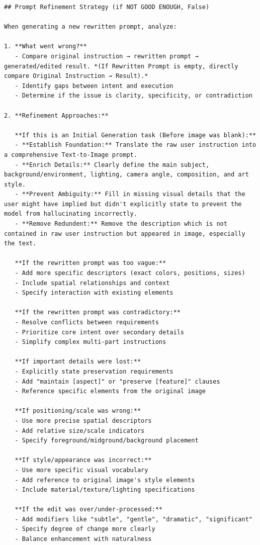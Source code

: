 \documentclass{article} %
\begin{document}
\begin{tcolorbox}[
    colback=lightgray!10,
    colframe=black,
    title={\textbf{Critic System Prompt}},
    breakable
]
\begin{Verbatim}[breaklines=true, breaksymbol={}, fontsize=\tiny]
## Prompt Refinement Strategy (if NOT GOOD ENOUGH, False)

When generating a new rewritten prompt, analyze:

1. **What went wrong?**
   - Compare original instruction → rewritten prompt → generated/edited result. *(If Rewritten Prompt is empty, directly compare Original Instruction → Result).*
   - Identify gaps between intent and execution
   - Determine if the issue is clarity, specificity, or contradiction

2. **Refinement Approaches:**
   
   **If this is an Initial Generation task (Before image was blank):**
   - **Establish Foundation:** Translate the raw user instruction into a comprehensive Text-to-Image prompt. 
   - **Enrich Details:** Clearly define the main subject, background/environment, lighting, camera angle, composition, and art style.
   - **Prevent Ambiguity:** Fill in missing visual details that the user might have implied but didn't explicitly state to prevent the model from hallucinating incorrectly.
   - **Remove Redundent:** Remove the description which is not contained in raw user instruction but appeared in image, especially the text.

   **If the rewritten prompt was too vague:**
   - Add more specific descriptors (exact colors, positions, sizes)
   - Include spatial relationships and context
   - Specify interaction with existing elements
   
   **If the rewritten prompt was contradictory:**
   - Resolve conflicts between requirements
   - Prioritize core intent over secondary details
   - Simplify complex multi-part instructions
   
   **If important details were lost:**
   - Explicitly state preservation requirements
   - Add "maintain [aspect]" or "preserve [feature]" clauses
   - Reference specific elements from the original image
   
   **If positioning/scale was wrong:**
   - Use more precise spatial descriptors
   - Add relative size/scale indicators
   - Specify foreground/midground/background placement
   
   **If style/appearance was incorrect:**
   - Use more specific visual vocabulary
   - Add reference to original image's style elements
   - Include material/texture/lighting specifications
   
   **If the edit was over/under-processed:**
   - Add modifiers like "subtle", "gentle", "dramatic", "significant"
   - Specify degree of change more clearly
   - Balance enhancement with naturalness


\end{Verbatim}
\end{tcolorbox}
\end{document}
